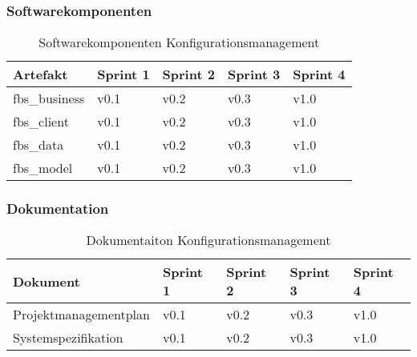 \subsubsection{Softwarekomponenten}
\begin{table}[H]
\begin{tabular}{ | p{} | p{} | p{} | p{} | p{} | }
\hline \rowcolor{gray!50}
	\textbf{Artefakt} 		 &
	\textbf{Sprint 1}	 	 &
	\textbf{Sprint 2}	 	 &
	\textbf{Sprint 3}		 &
	\textbf{Sprint 4}
	\\	\hline
	fbs\_business 	&
	v0.1 			&
	v0.2 			&
	v0.3 			&
	v1.0
	\\  \hline	%
	fbs\_client 		&
	v0.1 			&
	v0.2 			&
	v0.3 			&
	v1.0
	\\  \hline	%
	fbs\_data 		&
	v0.1 			&
	v0.2 			&
	v0.3 			&
	v1.0
	\\  \hline	%
	fbs\_model 		&
	v0.1 			&
	v0.2 			&
	v0.3 			&
	v1.0
	\\  \hline	%
\end{tabular}
\label{tab:config_sw}
\caption{Softwarekomponenten Konfigurationsmanagement}
\end{table}

\subsubsection{Dokumentation}
\begin{table}[H]
\begin{tabular}{ | p{} | p{} | p{} | p{} | p{} | }
\hline \rowcolor{gray!50}
	\textbf{Dokument} 		&
	\textbf{Sprint 1}	 	&
	\textbf{Sprint 2}	 	&
	\textbf{Sprint 3}		&
	\textbf{Sprint 4}
	\\	\hline
	Projektmanagementplan 	&
	v0.1 					&
	v0.2 					&
	v0.3 					&
	v1.0
	\\  \hline	%
	Systemspezifikation 	&
	v0.1 					&
	v0.2 					&
	v0.3 					&
	v1.0
	\\  \hline	%
\end{tabular}
\label{tab:config_dok}
\caption{Dokumentaiton Konfigurationsmanagement}
\end{table}

